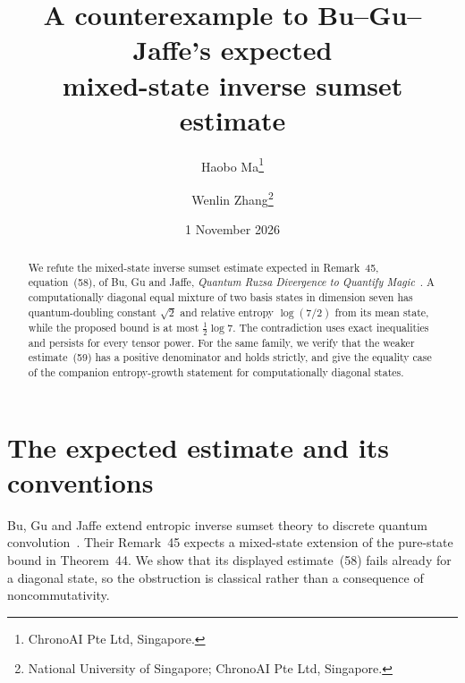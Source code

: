 \documentclass[10pt]{article}
\title{A counterexample to Bu--Gu--Jaffe's expected\protect\\ mixed-state inverse sumset estimate}
\author{Haobo Ma\thanks{ChronoAI Pte Ltd, Singapore.}\and
Wenlin Zhang\thanks{National University of Singapore; ChronoAI Pte Ltd, Singapore.}}
\date{1 November 2026}
\begin{document}
\maketitle
\begin{abstract}
We refute the mixed-state inverse sumset estimate expected in Remark~45,
equation~(58), of Bu, Gu and Jaffe, \emph{Quantum Ruzsa Divergence to Quantify
Magic}~\cite[arXiv:2401.14385v3]{BGJ}.
A computationally diagonal equal mixture of two basis states in dimension seven has
quantum-doubling constant $\sqrt2$ and relative entropy $\log(7/2)$ from its
mean state, while the proposed bound is at most $\tfrac12\log7$.
The contradiction uses exact inequalities and persists for every tensor power.
For the same family, we verify that the weaker estimate~(59) has a positive
denominator and holds strictly, and give the equality case of the companion
entropy-growth statement for computationally diagonal states.
\end{abstract}

\section{The expected estimate and its conventions}

Bu, Gu and Jaffe extend entropic inverse sumset theory to discrete quantum
convolution~\cite{BGJ}. Their Remark~45 expects a mixed-state extension of
the pure-state bound in Theorem~44. We show that its displayed estimate~(58)
fails already for a diagonal state, so the obstruction is classical rather
than a consequence of noncommutativity.
\end{document}
